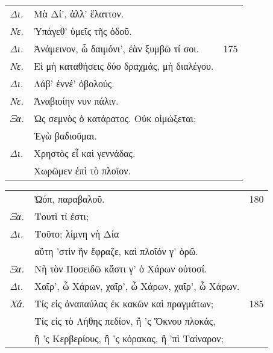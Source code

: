 \documentclass[13pt]{article}
\begin{document}
\begin{greek}
\begin{spacing}{1.5}
\begin{tabularx}{\textwidth}{@{}lXr@{}}
  \textit{Δι.} & Μὰ Δί', ἀλλ' ἔλαττον. & \\
  \textit{Νε.} & \hspace*{9em} Ὑπάγεθ' ὑμεῖς τῆς ὁδοῦ. & \\
  \textit{Δι.} & Ἀνάμεινον, ὦ δαιμόνι', ἐὰν ξυμβῶ τί σοι. & 175 \\
  \textit{Νε.} & Εἰ μὴ καταθήσεις δύο δραχμάς, μὴ διαλέγου. & \\
  \textit{Δι.} & Λάβ' ἐννέ' ὀβολούς. & \\
  \textit{Νε.} & \hspace*{8em} Ἀναβιοίην νυν πάλιν. & \\
  \textit{Ξα.} & Ὡς σεμνὸς ὁ κατάρατος. Οὐκ οἰμώξεται; & \\
  & Ἐγὼ βαδιοῦμαι. & \\
  \textit{Δι.} & \hspace*{7em} Χρηστὸς εἶ καὶ γεννάδας. & \\
  & Χωρῶμεν ἐπὶ τὸ πλοῖον. & \\
  
\end{tabularx}

\noindent\textit{\MakeUppercase{}}

\begin{tabularx}{\textwidth}{@{}lXr@{}}
  \phantom{Xά.} & \hspace*{10em} Ὠόπ, παραβαλοῦ. & 180 \\
  \textit{Ξα.} & Τουτὶ τί ἐστι; & \\
  \textit{Δι.} & \hspace*{6em} Τοῦτο; λίμνη νὴ Δία & \\
  & αὕτη 'στὶν ἣν ἔφραζε, καὶ πλοῖόν γ' ὁρῶ. & \\
  \textit{Ξα.} & Νὴ τὸν Ποσειδῶ κἄστι γ' ὁ Χάρων οὑτοσί. & \\
  \textit{Δι.} & Χαῖρ', ὦ Χάρων, χαῖρ', ὦ Χάρων, χαῖρ', ὦ Χάρων. & \\
  \textit{Χά.} & Τίς εἰς ἀναπαύλας ἐκ κακῶν καὶ πραγμάτων; & 185 \\
  & Τίς εἰς τὸ Λήθης πεδίον, ἢ 'ς Ὄκνου πλοκάς, & \\
  & ἢ 'ς Κερβερίους, ἢ 'ς κόρακας, ἢ 'πὶ Ταίναρον; & \\
\end{tabularx}

\end{spacing}

\newpage


\end{greek}
\end{document}
